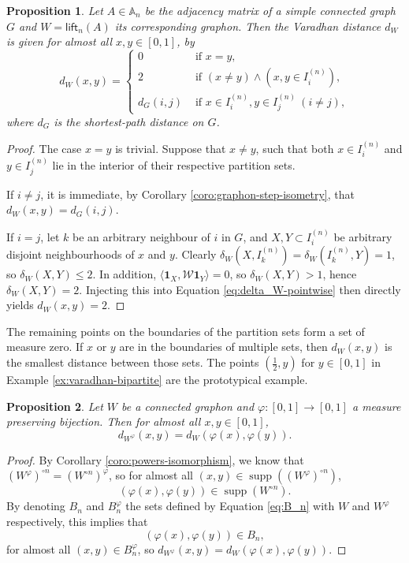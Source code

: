 \documentclass[11pt]{article}
\def\supp{\operatorname{supp}}
\def\AA{\mathbb{A}}
\def\II{\bm{1}}
\def\calW{\mathcal{W}}
\newcommand{\sans}[1]{\mathsf{#1}}
\def\lift{\sans{lift}}
\newtheorem{proposition}{Proposition}[section]
\theoremstyle{definition}
\begin{document}
\begin{proposition}
    Let $A\in\AA_n$ be the adjacency matrix of a simple connected graph $G$ and $W = \lift_n (A)$ its corresponding graphon. Then the Varadhan distance $d_W$ is given for almost all $x,y \in [0,1]$, by
    $$ d_W(x,y) = \begin{cases}
        0 & \text{ if } x=y,\\
        2 & \text{ if } (x\neq y) \wedge (x,y \in I^{(n)}_i),\\
        d_G(i,j) & \text{ if } x\in I^{(n)}_i, y \in I^{(n)}_j~ (i\neq j),
    \end{cases} $$
    where $d_G$ is the shortest-path distance on $G$.
\end{proposition}

\begin{proof}
    The case $x=y$ is trivial. Suppose that $x\neq y$, such that both $x \in I^{(n)}_i$ and $y \in I^{(n)}_j$ lie in the interior of their respective partition sets. 
    
    If $i \neq j$, it is immediate, by Corollary \ref{coro:graphon-step-isometry}, that $d_W(x,y)=d_G(i,j)$. 
    
    If $i=j$, let $k$ be an arbitrary neighbour of $i$ in $G$, and $X, Y \subset I^{(n)}_i$ be arbitrary disjoint neighbourhoods of $x$ and $y$. Clearly $\delta_W (X, I^{(n)}_k) = \delta_W (I^{(n)}_k, Y) = 1$, so $\delta_W (X,Y) \le 2$. In addition, $\langle \II_X, \calW \II_Y \rangle = 0$, so $\delta_W (X,Y) > 1$, hence $\delta_W(X,Y) = 2$. Injecting this into Equation \eqref{eq:delta_W-pointwise} then directly yields $d_W(x,y) = 2$.
\end{proof}

The remaining points on the boundaries of the partition sets form a set of measure zero. If $x$ or $y$ are in the boundaries of multiple sets, then $d_W(x,y)$ is the smallest distance between those sets. The points $(\frac{1}{2},y)$ for $y\in [0,1]$ in Example \ref{ex:varadhan-bipartite} are the prototypical example.

\begin{proposition} \label{prop:d_W-isomorphism}
    Let $W$ be a connected graphon and $\varphi : [0,1] \rightarrow [0,1]$ a measure preserving bijection. Then for almost all $x,y \in [0,1]$,
    $$ d_{W^\varphi} (x,y) = d_W (\varphi(x),\varphi(y)). $$
\end{proposition}
\begin{proof}
    By Corollary \ref{coro:powers-isomorphism}, we know that $(W^\varphi)^{\circ n} = (W^{\circ n})^\varphi$, so for almost all $(x,y) \in \supp ((W^\varphi)^{\circ n})$, 
    $$(\varphi(x), \varphi(y)) \in \supp (W^{\circ n}).$$
    By denoting $B_n$ and $B_n^\varphi$ the sets defined by Equation \eqref{eq:B_n} with $W$ and $W^\varphi$ respectively, this implies that 
     $$(\varphi(x),\varphi(y)) \in B_n,$$
    for almost all $(x,y)\in B_n^\varphi$, so $d_{W^\varphi} (x, y) = d_W(\varphi(x),\varphi(y))$.
\end{proof}
\end{document}
